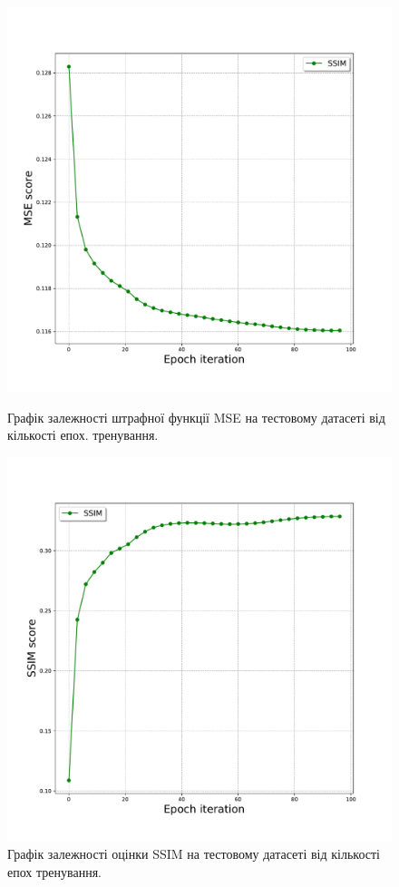 \documentclass[14pt,a4paper]{extarticle}
\newcounter{e}
\numberwithin{equation}{section}
\numberwithin{figure}{section}
\begin{document}
	\begin{figure}[H]
		\includegraphics[width=1\textwidth]{resources/training-mse.pdf}
		\caption{Графік залежності штрафної функції MSE на тестовому датасеті від кількості епох. тренування.}
		\label{fig:attacks_bench}
		\endminipage\hfill
		\includegraphics[width=1\textwidth]{resources/training-ssim.pdf}
		\caption{Графік залежності оцінки SSIM на тестовому датасеті від кількості епох тренування.}
		\label{fig:defenses_bench}
		\endminipage
	\end{figure}
	
\end{document}
